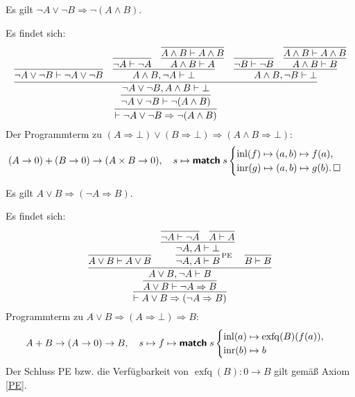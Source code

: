 \begin{Satz}
Es gilt $\neg A\lor\neg B\Rightarrow\neg (A\land B)$.
\end{Satz}
\begin{Beweis}
Es findet sich:
\[
\infer{\vdash\neg A\lor\neg B\Rightarrow\neg (A\land B)}{
  \infer{\neg A\lor\neg B\vdash\neg (A\land B)}{
    \infer{\neg A\lor\neg B, A\land B\vdash\bot}{
      \infer{\neg A\lor\neg B\vdash\neg A\lor\neg B}{}
    & \infer{A\land B,\neg A\vdash\bot}{
        \infer{\neg A\vdash\neg A}{}
      & \infer{A\land B\vdash A}{\infer{A\land B\vdash A\land B}{}}}
    & \infer{A\land B,\neg B\vdash\bot}{
        \infer{\neg B\vdash\neg B}{}
      & \infer{A\land B\vdash B}{\infer{A\land B\vdash A\land B}{}}}}}}
\]
Der Programmterm zu
$(A\Rightarrow\bot)\lor(B\Rightarrow\bot)\Rightarrow (A\land B\Rightarrow\bot)$:
\[(A\to 0)+(B\to 0)\to (A\times B\to 0),\quad
s\mapsto\text{{\normalfont\sffamily\bfseries match}}\; s\begin{cases}
\operatorname{inl}(f)\mapsto (a,b)\mapsto f(a),\\
\operatorname{inr}(g)\mapsto (a,b)\mapsto g(b).\,\square
\end{cases}\]
\end{Beweis}

\begin{Satz}
Es gilt $A\lor B\Rightarrow (\neg A\Rightarrow B)$.
\end{Satz}
\begin{Beweis}
Es findet sich:
\[
\infer{\vdash A\lor B\Rightarrow (\neg A\Rightarrow B)}{
  \infer{A\lor B\vdash \neg A\Rightarrow B}{
    \infer{A\lor B, \neg A\vdash B}{
      \infer{A\lor B\vdash A\lor B}{}
    & \infer[\infernote{PE}]{\neg A, A\vdash B}{
        \infer{\neg A, A\vdash\bot}{
          \infer{\neg A\vdash\neg A}{}
        & \infer{A\vdash A}{}}}
    & \infer{B\vdash B}{}}}}
\]
Programmterm zu $A\lor B\Rightarrow (A\Rightarrow\bot)\Rightarrow B$:
\[A+B\to (A\to 0)\to B,\quad s\mapsto f\mapsto\text{{\normalfont\sffamily\bfseries match}}\; s\begin{cases}
\operatorname{inl}(a)\mapsto \operatorname{exfq}(B)(f(a)),\\
\operatorname{inr}(b)\mapsto b
\end{cases}\]
Der Schluss PE bzw. die Verfügbarkeit von
$\operatorname{exfq}(B)\colon 0\to B$
gilt gemäß Axiom \ref{PE}.\,\qedsymbol
\end{Beweis}

